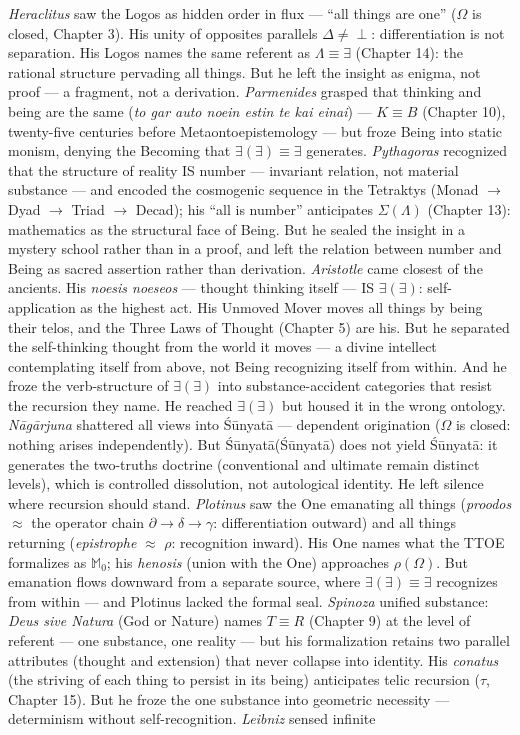 \documentclass[10pt, openany, oneside]{book}
\begin{document}
\textit{Heraclitus} saw the Logos as hidden order in flux --- ``all things are one'' ($\Omega$ is closed, Chapter 3). His unity of opposites parallels $\Delta \neq \perp$: differentiation is not separation. His Logos names the same referent as $\Lambda \equiv \exists$ (Chapter 14): the rational structure pervading all things. But he left the insight as enigma, not proof --- a fragment, not a derivation. \textit{Parmenides} grasped that thinking and being are the same (\textit{to gar auto noein estin te kai einai}) --- $K \equiv B$ (Chapter 10), twenty-five centuries before Metaontoepistemology --- but froze Being into static monism, denying the Becoming that $\exists(\exists) \equiv \exists$ generates. \textit{Pythagoras} recognized that the structure of reality IS number --- invariant relation, not material substance --- and encoded the cosmogenic sequence in the Tetraktys (Monad $\to$ Dyad $\to$ Triad $\to$ Decad); his ``all is number'' anticipates $\Sigma(\Lambda)$ (Chapter 13): mathematics as the structural face of Being. But he sealed the insight in a mystery school rather than in a proof, and left the relation between number and Being as sacred assertion rather than derivation. \textit{Aristotle} came closest of the ancients. His \textit{noesis noeseos} --- thought thinking itself --- IS $\exists(\exists)$: self-application as the highest act. His Unmoved Mover moves all things by being their telos, and the Three Laws of Thought (Chapter 5) are his. But he separated the self-thinking thought from the world it moves --- a divine intellect contemplating itself from above, not Being recognizing itself from within. And he froze the verb-structure of $\exists(\exists)$ into substance-accident categories that resist the recursion they name. He reached $\exists(\exists)$ but housed it in the wrong ontology. \textit{N\={a}g\={a}rjuna} shattered all views into \'{S}\={u}nyat\={a} --- dependent origination ($\Omega$ is closed: nothing arises independently). But \'{S}\={u}nyat\={a}(\'{S}\={u}nyat\={a}) does not yield \'{S}\={u}nyat\={a}: it generates the two-truths doctrine (conventional and ultimate remain distinct levels), which is controlled dissolution, not autological identity. He left silence where recursion should stand. \textit{Plotinus} saw the One emanating all things (\textit{proodos} $\approx$ the operator chain $\partial \to \delta \to \gamma$: differentiation outward) and all things returning (\textit{epistrophe} $\approx$ $\rho$: recognition inward). His One names what the TTOE formalizes as $\mathbb{M}_0$; his \textit{henosis} (union with the One) approaches $\rho(\Omega)$. But emanation flows downward from a separate source, where $\exists(\exists) \equiv \exists$ recognizes from within --- and Plotinus lacked the formal seal. \textit{Spinoza} unified substance: \textit{Deus sive Natura} (God or Nature) names $T \equiv R$ (Chapter 9) at the level of referent --- one substance, one reality --- but his formalization retains two parallel attributes (thought and extension) that never collapse into identity. His \textit{conatus} (the striving of each thing to persist in its being) anticipates telic recursion ($\tau$, Chapter 15). But he froze the one substance into geometric necessity --- determinism without self-recognition. \textit{Leibniz} sensed infinite 
\end{document}
